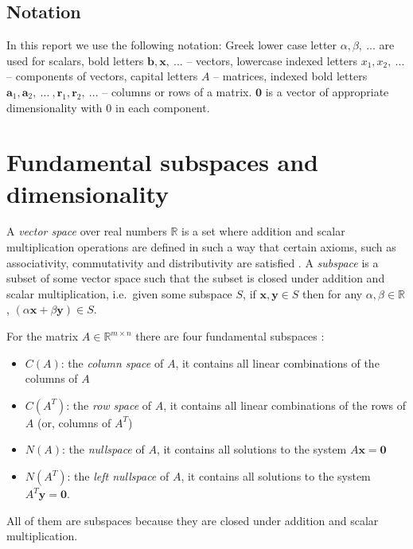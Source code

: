 \documentclass{acm_proc_article-sp}
\begin{document}
\subsection{Notation}

In this report we use the following notation: Greek lower case letter \(\alpha, \beta, \ ...\) are used for scalars, bold letters \(\mathbf b, \mathbf x, \ ...\) -- vectors, lowercase indexed letters \(x_1, x_2, \ ...\) -- components of vectors,
capital letters \(A\) -- matrices, indexed bold letters
\(\mathbf a_1, \mathbf a_2, \ ... \ , \mathbf r_1, \mathbf r_2, \ ...\)
-- columns or rows of a matrix. \(\mathbf 0\) is a vector of appropriate
dimensionality with \(0\) in each component.


\section{Fundamental subspaces and dimensionality}

A \emph{vector space} over real numbers $\mathbb R$ is a set where addition and scalar 
multiplication operations are defined in such a way that certain axioms, such as associativity,
commutativity and distributivity are satisfied \cite{strang1988book}. A \emph{subspace} is a 
subset of some vector space such that the subset is closed under addition and 
scalar multiplication, i.e.~given some subspace \(S\),
if \(\mathbf x, \mathbf y \in S\) then for any $\alpha, \beta \in \mathbb R$, \((\alpha \mathbf x + \beta \mathbf y) \in S\).

For the matrix \(A \in\mathbb R^{m \times n}\) there are four fundamental subspaces \cite{strangfour}:

\begin{itemize}
\itemsep1pt\parskip0pt
\item
  \(C(A)\): the \emph{column space} of \(A\), it contains all linear combinations
  of the columns of \(A\)
\item
  \(C(A^T)\): the \emph{row space} of \(A\), it contains all linear combinations
  of the rows of \(A\) (or, columns of \(A^T\))
\item
  \(N(A)\): the \emph{nullspace} of \(A\), it contains all solutions to the system
  \(A \mathbf x = \mathbf 0\)
\item
  \(N(A^T)\): the \emph{left nullspace} of \(A\), it contains all solutions to the system
  \(A^T \mathbf y = \mathbf 0\).
\end{itemize}

All of them are subspaces because they are closed under addition and
scalar multiplication.
\end{document}
